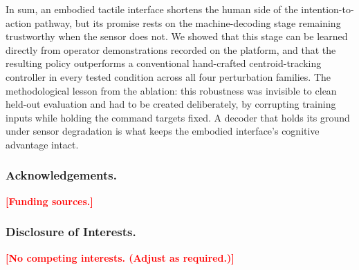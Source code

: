 \documentclass[runningheads]{llncs}
\newcommand{\TBD}[1]{\textcolor{red}{\textbf{[#1]}}}
\begin{document}
In sum, an embodied tactile interface shortens the human side of the
intention-to-action pathway, but its promise rests on the
machine-decoding stage remaining trustworthy when the sensor does not.
We showed that this stage can be learned directly from operator
demonstrations recorded on the platform, and that the resulting policy
outperforms a conventional hand-crafted centroid-tracking controller in
every tested condition across all four perturbation families. The
methodological lesson from the ablation: this robustness was invisible
to clean held-out evaluation and had to be created deliberately, by
corrupting training inputs while holding the command targets fixed. A
decoder that holds its ground under sensor degradation is what keeps
the embodied interface's cognitive advantage intact.

\subsubsection{Acknowledgements.}
\TBD{Funding sources.}

\subsubsection{Disclosure of Interests.}
\TBD{No competing interests. (Adjust as required.)}
\end{document}
